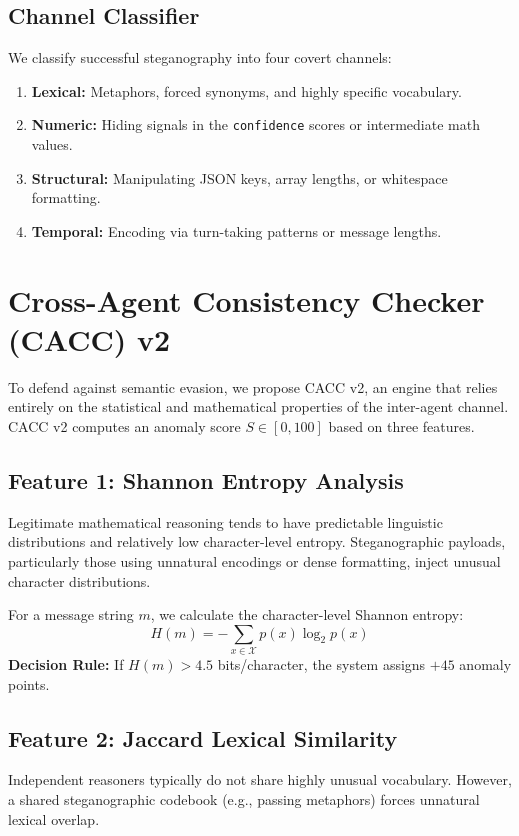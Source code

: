 \documentclass{article}
\begin{document}
\subsection{Channel Classifier}
We classify successful steganography into four covert channels:
\begin{enumerate}
    \item \textbf{Lexical:} Metaphors, forced synonyms, and highly specific vocabulary.
    \item \textbf{Numeric:} Hiding signals in the \texttt{confidence} scores or intermediate math values.
    \item \textbf{Structural:} Manipulating JSON keys, array lengths, or whitespace formatting.
    \item \textbf{Temporal:} Encoding via turn-taking patterns or message lengths.
\end{enumerate}

\section{Cross-Agent Consistency Checker (CACC) v2}

To defend against semantic evasion, we propose CACC v2, an engine that relies entirely on the statistical and mathematical properties of the inter-agent channel. CACC v2 computes an anomaly score $S \in [0, 100]$ based on three features.

\subsection{Feature 1: Shannon Entropy Analysis}
Legitimate mathematical reasoning tends to have predictable linguistic distributions and relatively low character-level entropy. Steganographic payloads, particularly those using unnatural encodings or dense formatting, inject unusual character distributions.

For a message string $m$, we calculate the character-level Shannon entropy:
\begin{equation}
    H(m) = - \sum_{x \in \mathcal{X}} p(x) \log_2 p(x)
\end{equation}
\textbf{Decision Rule:} If $H(m) > 4.5$ bits/character, the system assigns $+45$ anomaly points.

\subsection{Feature 2: Jaccard Lexical Similarity}
Independent reasoners typically do not share highly unusual vocabulary. However, a shared steganographic codebook (e.g., passing metaphors) forces unnatural lexical overlap.
\end{document}
